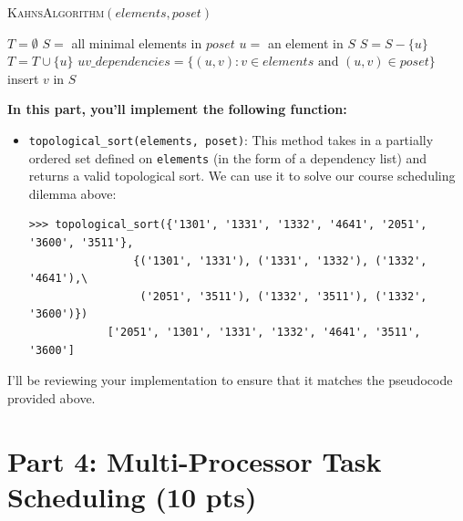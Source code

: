 \documentclass{article}
\begin{document}
    \begin{algorithm}
        \caption{\textsc{KahnsAlgorithm}$(elements, poset)$}\label{alg:cap}
        \label{alg:topological_sort}
        \begin{algorithmic}
            \State $T = \emptyset$
            \State $S = $ all minimal elements in $poset$
                \State $u = $ an element in $S$
                \State $S = S - \{u\}$
                \State $T = T \cup \{u\}$
                \State $uv\_dependencies = \{(u, v) : v \in elements \text{ and }(u, v) \in poset\}$
                     insert $v$ in $S$ \EndIf
                \EndFor
            \EndWhile
            \State {}
        \end{algorithmic}
    \end{algorithm}
    
    \begin{tcolorbox}[colback=yellow!30]
        \textbf{In this part, you'll implement the following function:}
        \begin{itemize}
            \item 
        \lstinline{topological_sort(elements, poset)}: This method takes in a partially ordered set defined on \lstinline{elements} (in the form of a dependency list) and returns a valid topological sort. We can use it to solve our course scheduling dilemma above:

    \begin{lstlisting}[belowskip=-10pt]
        >>> topological_sort({'1301', '1331', '1332', '4641', '2051', '3600', '3511'},
                {('1301', '1331'), ('1331', '1332'), ('1332', '4641'),\
                 ('2051', '3511'), ('1332', '3511'), ('1332', '3600')})
            ['2051', '1301', '1331', '1332', '4641', '3511', '3600']
    \end{lstlisting}
        \end{itemize}
    I'll be reviewing your implementation to ensure that it matches the pseudocode provided above.
    \end{tcolorbox}

\section*{Part 4: Multi-Processor Task Scheduling (10 pts)}
\end{document}
